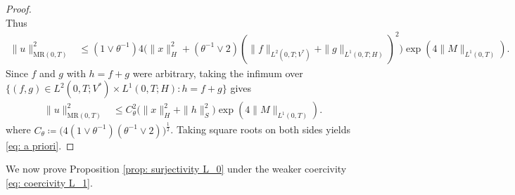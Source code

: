 \documentclass{amsart}
\renewcommand{\MR}{\mathrm{MR}}
\newcommand{\<}{\langle}
\newcommand{\?}{\rangle}
\theoremstyle{plain}
\theoremstyle{remark}
\theoremstyle{plain}
\numberwithin{equation}{section}
\begin{document}
\begin{proof}
\[\]
Thus
\begin{align*}
  \|u\|_{\MR(0,T)}^2 &\leq (1\vee\theta^{-1})4\big(\|x\|_H^2+(\theta^{-1}\vee2)(\|f\|_{L^2(0,T;V^*)} + \|g\|_{L^1(0,T;H)})^2\big)\exp(4\|M\|_{L^1(0,T)}).
\end{align*}
Since $f$ and $g$ with $h=f+g$ were arbitrary, taking the infimum over $\{(f,g)\in L^2(0,T;V^*)\times L^1(0,T;H):h=f+g\}$ gives
\begin{align*}
  \|u\|_{\MR(0,T)}^2 &\leq C_{\theta}^2  \big(\|x\|_H^2+\|h\|_{S}^2\big)\exp(4\|M\|_{L^1(0,T)}).
\end{align*}
where $C_\theta\coloneqq \big(4(1\vee\theta^{-1})(\theta^{-1}\vee2)\big)^{\frac{1}{2}}$. Taking square roots on both sides yields \eqref{eq: a priori}.
\end{proof}

We now prove Proposition \ref{prop: surjectivity L_0} under the weaker coercivity \eqref{eq: coercivity L_1}.
\end{document}
